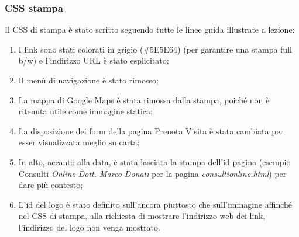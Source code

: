 \begin{center}
\end{center}

\bigskip

\subsubsection{CSS stampa}
Il CSS  di stampa è stato scritto seguendo tutte le linee guida illustrate a lezione:
\begin{enumerate}
\item I link sono stati colorati in grigio (\#5E5E64) (per garantire una stampa full b/w) e l’indirizzo URL è stato esplicitato;
\item Il menù di navigazione è stato rimosso;
\item La mappa di Google Maps è stata rimossa dalla stampa, poiché non è ritenuta utile come immagine statica;
\item La disposizione dei form della pagina Prenota Visita è stata cambiata per esser visualizzata meglio su carta;
\item In alto, accanto alla data, è stata lasciata la stampa dell’id pagina (esempio Consulti \textit{Online-Dott. Marco Donati} per la pagina \textit{consultionline.html}) per dare più contesto;
\item L'id del logo è stato definito sull'ancora piuttosto che sull'immagine affinché nel CSS di stampa, alla richiesta di mostrare l’indirizzo web dei link, l’indirizzo del logo non venga mostrato. \\
\end{enumerate}


